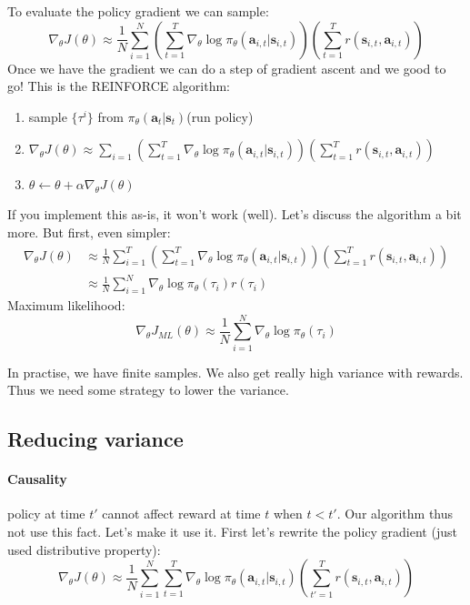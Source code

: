 \documentclass{report}
\begin{document}
To evaluate the policy gradient we can sample:
\begin{equation}
		\nabla_\theta J(\theta) \approx \frac{1}{N}  \sum_{i=1}^{N} 
		\left ( \sum_{t=1}^{T} \nabla_\theta \log \pi_\theta (\bm{a}_{i,t} | \bm{s}_{i,t} ) \right )
		\left ( \sum_{t=1}^{T} r(\bm{s}_{i,t}, \bm{a}_{i,t}) \right )
\end{equation}
Once we have the gradient we can do a step of gradient ascent and we good to go!
This is the REINFORCE algorithm:
\begin{enumerate}
		\item sample $\{\tau^i\}$ from $\pi_\theta(\bm{a}_t | \bm{s}_t)$(run policy)
		\item $\nabla_\theta J(\theta) \approx   \sum_{i=1}^{} 
		\left ( \sum_{t=1}^{T} \nabla_\theta \log \pi_\theta (\bm{a}_{i,t} | \bm{s}_{i,t} ) \right )
		\left ( \sum_{t=1}^{T} r(\bm{s}_{i,t}, \bm{a}_{i,t}) \right )$
\item $\theta \leftarrow \theta + \alpha \nabla_\theta J(\theta) $
\end{enumerate}


If you implement this as-is, it won't work (well).
Let's discuss the algorithm a bit more.
But first, even simpler:
\begin{align}
		\nabla_\theta J(\theta) &\approx \frac{1}{N}  \sum_{i=1}^{T} 
		\left ( \sum_{t=1}^{T} \nabla_\theta \log \pi_\theta (\bm{a}_{i,t} | \bm{s}_{i,t} ) \right )
		\left ( \sum_{t=1}^{T} r(\bm{s}_{i,t}, \bm{a}_{i,t}) \right ) \\
		&\approx \frac{1}{N} \sum_{i=1}^{N} \nabla_\theta \log \pi_\theta (\tau_i)r(\tau_i)
\end{align}
Maximum likelihood:
\begin{equation}
		\nabla_\theta J_{ML}(\theta) \approx \frac{1}{N} \sum_{i=1}^{N} \nabla_\theta \log \pi_\theta (\tau_i) 
\end{equation}

In practise, we have finite samples. We also get really high variance with rewards.
Thus we need some strategy to lower the variance.

\subsection{Reducing variance}
\paragraph{Causality} policy at time $t'$ cannot affect reward at time $t$ when $t<t'$.
Our algorithm thus not use this fact. Let's make it use it.
First let's rewrite the policy gradient (just used distributive property):
\begin{equation}
		\nabla_\theta J(\theta) \approx 
		\frac{1}{N} \sum_{i=1}^{N} \sum_{t=1}^{T} \nabla_\theta \log \pi_\theta (\bm{a}_{i,t}| \bm{s}_{i,t})
		\left ( \sum_{t'=1}^{T} r (\bm{s}_{i,t}, \bm{a}_{i,t}) \right )
\end{equation}
\end{document}
